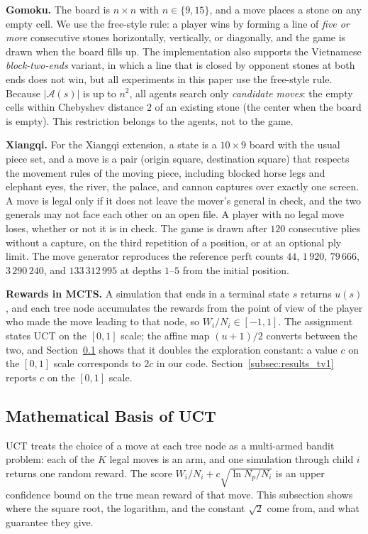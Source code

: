 \textbf{Gomoku.} The board is $n\times n$ with $n \in \{9, 15\}$, and a move places a stone on any empty cell. We use the free-style rule: a player wins by forming a line of \emph{five or more} consecutive stones horizontally, vertically, or diagonally, and the game is drawn when the board fills up. The implementation also supports the Vietnamese \emph{block-two-ends} variant, in which a line that is closed by opponent stones at both ends does not win, but all experiments in this paper use the free-style rule. Because $|\mathcal{A}(s)|$ is up to $n^2$, all agents search only \emph{candidate moves}: the empty cells within Chebyshev distance $2$ of an existing stone (the center when the board is empty). This restriction belongs to the agents, not to the game.

\textbf{Xiangqi.} For the Xiangqi extension, a state is a $10\times 9$ board with the usual piece set, and a move is a pair (origin square, destination square) that respects the movement rules of the moving piece, including blocked horse legs and elephant eyes, the river, the palace, and cannon captures over exactly one screen. A move is legal only if it does not leave the mover's general in check, and the two generals may not face each other on an open file. A player with no legal move loses, whether or not it is in check. The game is drawn after $120$ consecutive plies without a capture, on the third repetition of a position, or at an optional ply limit. The move generator reproduces the reference perft counts $44$, $1\,920$, $79\,666$, $3\,290\,240$, and $133\,312\,995$ at depths $1$--$5$ from the initial position.

\textbf{Rewards in MCTS.} A simulation that ends in a terminal state $s$ returns $u(s)$, and each tree node accumulates the rewards from the point of view of the player who made the move leading to that node, so $W_i/N_i \in [-1, 1]$. The assignment states UCT on the $[0, 1]$ scale; the affine map $(u+1)/2$ converts between the two, and Section~\ref{subsec:math_uct} shows that it doubles the exploration constant: a value $c$ on the $[0, 1]$ scale corresponds to $2c$ in our code. Section~\ref{subsec:results_tv1} reports $c$ on the $[0, 1]$ scale.

\subsection{Mathematical Basis of UCT}
\label{subsec:math_uct}

UCT treats the choice of a move at each tree node as a multi-armed bandit problem: each of the $K$ legal moves is an arm, and one simulation through child $i$ returns one random reward. The score $W_i/N_i + c\sqrt{\ln N_p/N_i}$ is an upper confidence bound on the true mean reward of that move. This subsection shows where the square root, the logarithm, and the constant $\sqrt{2}$ come from, and what guarantee they give.

